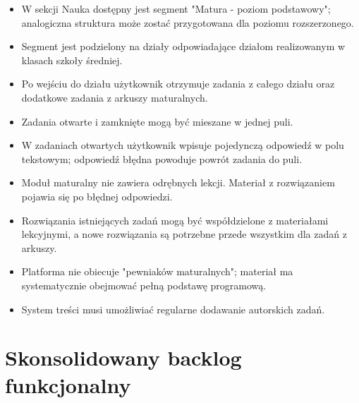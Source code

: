 \documentclass[12pt,a4paper]{report}
\begin{document}
\begin{ElearnRequirement}[title={Wymagania wynikające z komentarza}]
\begin{itemize}
  \item W sekcji Nauka dostępny jest segment "Matura - poziom podstawowy"; analogiczna struktura może zostać przygotowana dla poziomu rozszerzonego.
  \item Segment jest podzielony na działy odpowiadające działom realizowanym w klasach szkoły średniej.
  \item Po wejściu do działu użytkownik otrzymuje zadania z całego działu oraz dodatkowe zadania z arkuszy maturalnych.
  \item Zadania otwarte i zamknięte mogą być mieszane w jednej puli.
  \item W zadaniach otwartych użytkownik wpisuje pojedynczą odpowiedź w polu tekstowym; odpowiedź błędna powoduje powrót zadania do puli.
  \item Moduł maturalny nie zawiera odrębnych lekcji. Materiał z rozwiązaniem pojawia się po błędnej odpowiedzi.
  \item Rozwiązania istniejących zadań mogą być współdzielone z materiałami lekcyjnymi, a nowe rozwiązania są potrzebne przede wszystkim dla zadań z arkuszy.
  \item Platforma nie obiecuje "pewniaków maturalnych"; materiał ma systematycznie obejmować pełną podstawę programową.
  \item System treści musi umożliwiać regularne dodawanie autorskich zadań.
\end{itemize}
\end{ElearnRequirement}
\clearpage
\chapter{Skonsolidowany backlog funkcjonalny}
\end{document}
